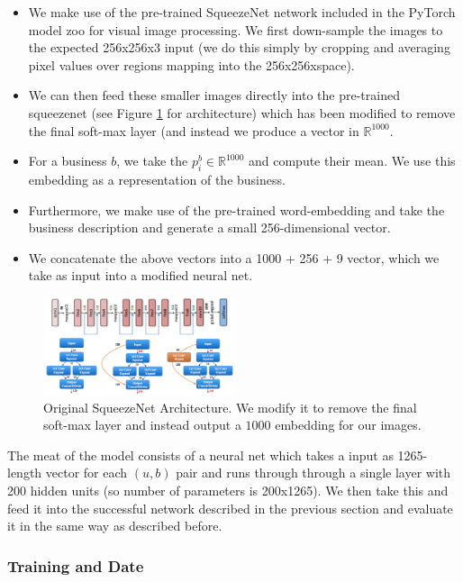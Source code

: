 \documentclass[letterpaper, 10 pt, conference]{ieeeconf}  %
\begin{document}
\begin{itemize}
\item We make use of the pre-trained SqueezeNet network included in the PyTorch model zoo for visual image processing. We first down-sample the images to the expected 256x256x3 input (we do this simply by cropping and averaging pixel values over regions mapping into the 256x256xspace).
\item We can then feed these smaller images directly into the pre-trained squeezenet (see Figure \ref{fig:squeezenet_architecture} for architecture) which has been modified to remove the final soft-max layer (and instead we produce a vector in $\mathbb{R}^1000$.
\item For a business $b$, we take the $p_i^b \in \mathbb{R}^1000$ and compute their mean. We use this embedding as a representation of the business.

\item Furthermore, we make use of the pre-trained word-embedding and take the business description and generate a small 256-dimensional vector.
\item We concatenate the above vectors into a 1000 + 256 + 9 vector, which we take as input into a modified neural net.
\end{itemize}

\begin{figure}[h!]
\centering
\includegraphics[width=0.5\textwidth]{../shared/figures/squeezenet.jpg}
\caption{Original SqueezeNet Architecture. We modify it to remove the final soft-max layer and instead output a $1000$ embedding for our images.}
\label{fig:squeezenet_architecture}
\end{figure}

The meat of the model consists of a neural net which takes a input as 1265-length vector for each $(u,b)$ pair and runs through through a single layer with 200 hidden units (so number of parameters is 200x1265). We then take this and feed it into the successful network described in the previous section and evaluate it in the same way as described before.

\subsubsection{Training and Date}
\end{document}
